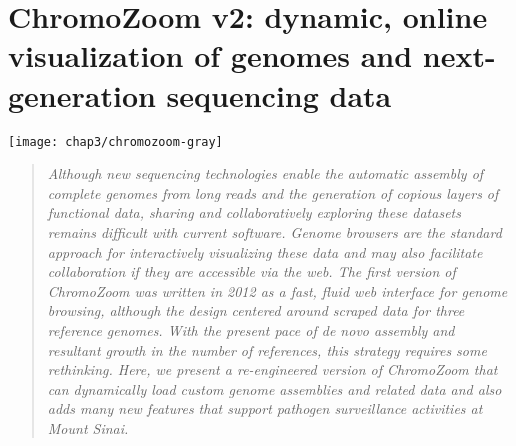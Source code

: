 
\chapter{ChromoZoom v2: dynamic, online visualization of genomes and next-generation sequencing data}
\label{chap:chromozoom}

\begin{marginfigure}[0.9cm]
  \texttt{[image: chap3/chromozoom-gray]}
\end{marginfigure}



\begin{quote}
\emph{Although new sequencing technologies enable the automatic assembly of complete genomes from long reads and the generation of copious layers of functional data, sharing and collaboratively exploring these datasets remains difficult with current software. Genome browsers are the standard approach for interactively visualizing these data and may also facilitate collaboration if they are accessible via the web. The first version of ChromoZoom was written in 2012 as a fast, fluid web interface for genome browsing, although the design centered around scraped data for three reference genomes. With the present pace of \emph{de novo} assembly and resultant growth in the number of references, this strategy requires some rethinking. Here, we present a re-engineered version of ChromoZoom that can dynamically load custom genome assemblies and related data and also adds many new features that support pathogen surveillance activities at Mount Sinai.}
\end{quote}

